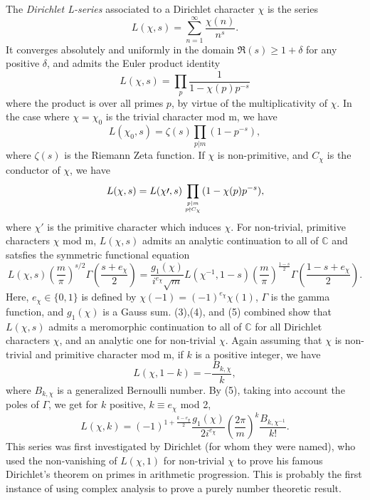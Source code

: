 \documentclass[12pt]{article}
\begin{document}
The \emph{Dirichlet L-series} associated to a Dirichlet character $\chi$ is the series 
\begin{equation}
L(\chi,s)=\sum_{n=1}^\infty \frac{\chi(n)}{n^s}.
\end{equation}
It converges absolutely and uniformly in the domain $\Re(s) \geq 1 + \delta$ for any positive $\delta$, and admits the Euler product identity
\begin{equation}
L(\chi,s)=\prod_p \frac{1}{1-\chi(p)p^{-s}}
\end{equation}
where the product is over all primes $p$, by virtue of the multiplicativity of $\chi$.  In the case where $\chi=\chi_0$ is the trivial character mod m, we have
\begin{equation}
L(\chi_0,s)=\zeta(s)\prod_{p|m} (1-p^{-s}),
\end{equation}
where $\zeta(s)$ is the Riemann Zeta function.  If $\chi$ is non-primitive, and $C_\chi$ is the conductor of $\chi$, we have
\begin{equation}
L(\chi,s)=L(\chi\prime,s)\prod_{p|m\atop p\nmid C_\chi}(1-\chi(p)p^{-s}),
\end{equation}
where $\chi\prime$ is the primitive character which induces $\chi$.  For non-trivial, primitive characters $\chi$ mod m, $L(\chi,s)$ admits an analytic continuation to all of $\mathbb{C}$ and satsfies the symmetric functional equation
\begin{equation}
L(\chi,s)\left(\frac{m}{\pi}\right)^{s/2}\Gamma\left(\frac{s+e_\chi}{2}\right)=\frac{g_1(\chi)}{i^{e_\chi}\sqrt{m}}L(\chi^{-1},1-s)\left(\frac{m}{\pi}\right)^{\frac{1-s}{2}}\Gamma\left(\frac{1-s+e_\chi}{2}\right).
\end{equation}
Here, $e_\chi\in \{0,1\}$ is defined by $\chi(-1)=(-1)^{e_\chi}\chi(1)$, $\Gamma$ is the gamma function, and $g_1(\chi)$ is a Gauss sum.
(3),(4), and (5) combined show that $L(\chi,s)$ admits a meromorphic continuation to all of $\mathbb{C}$ for all Dirichlet characters $\chi$, and an analytic one for non-trivial $\chi$.
Again assuming that $\chi$ is non-trivial and primitive character mod m, if $k$ is a positive integer, we have
\begin{equation}
L(\chi,1-k)=-\frac{B_{k,\chi}}{k},
\end{equation}
where $B_{k,\chi}$ is a generalized Bernoulli number.  By (5), taking into account the poles of $\Gamma$, we get for $k$ positive, $k \equiv e_\chi$ mod 2,
\begin{equation}
L(\chi,k)=(-1)^{1+\frac{k-e_\chi}{2}}\frac{g_1(\chi)}{2i^{e_\chi}}\left(\frac{2\pi}{m}\right)^k\frac{B_{k,\chi^{-1}}}{k!}.
\end{equation}
This series was first investigated by Dirichlet (for whom they were named), who used the non-vanishing of $L(\chi,1)$ for non-trivial $\chi$ to prove his famous Dirichlet's theorem on primes in arithmetic progression.  This is probably the first instance of using complex analysis to prove a purely number theoretic result.
\end{document}
